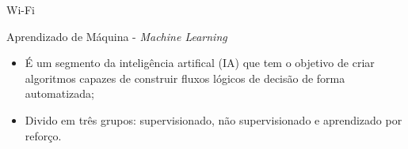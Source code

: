 \documentclass[xcolor={dvipsnames,svgnames,table}]{beamer}
\begin{document}
\begin{frame}
\begin{itemize}[label=\textcolor{black}{\textbullet}, left=0pt]
\begin{block}{Wi-Fi}
\begin{itemize}[label=\textcolor{black}{\textbullet}, left=5pt]
				\end{itemize}
			\end{block}
			\begin{block}{Aprendizado de Máquina - \textit{Machine Learning}}
				\begin{itemize}[label=\textcolor{black}{\textbullet}, left=5pt]
					\justifying
					\item É um segmento da inteligência artifical (IA) que tem o objetivo de criar algoritmos capazes de construir fluxos lógicos de decisão de forma automatizada; 
					\item Divido em três grupos: supervisionado, não supervisionado e aprendizado por reforço.
				\end{itemize}
			\end{block}
		\end{itemize}
	\end{frame}

	
\end{document}
